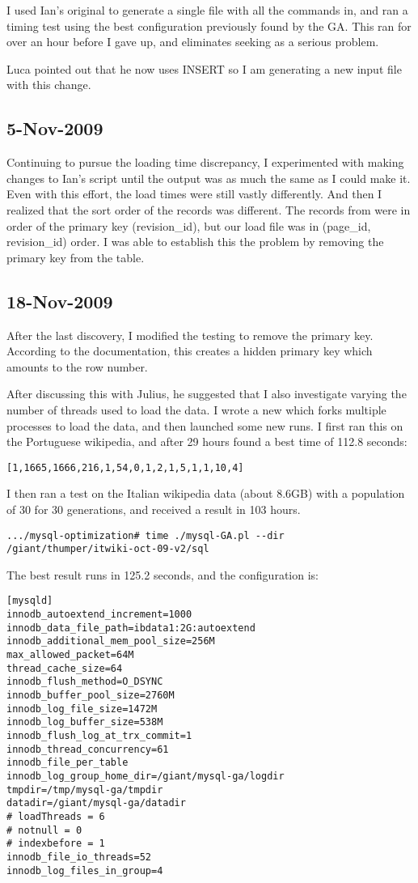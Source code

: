 I used Ian's original  to generate a single file with all the commands in,
and ran a timing test using the best configuration previously found by the GA.
This ran for over an hour before I gave up, and eliminates seeking as a serious problem.

Luca pointed out that he now uses INSERT so I am generating a new input file with this change.

\subsection{5-Nov-2009}

Continuing to pursue the loading time discrepancy, I experimented with making changes to Ian's
 script until the output was as much the same as I could make it.
Even with this effort, the load times were still vastly differently.
And then I realized that the sort order of the records was different.
The records from  were in order of the primary key (revision\_id),
but our load file was in (page\_id, revision\_id) order.
I was able to establish this the problem by removing the primary key from the table.

\subsection{18-Nov-2009}

After the last discovery, I modified the testing to remove the primary key.
According to the \mysql documentation, this creates a hidden primary key which
amounts to the row number.

After discussing this with Julius, he suggested that I also investigate varying
the number of threads used to load the data.
I wrote a new  which forks multiple \mysql processes to
load the data, and then launched some new runs.
I first ran this on the Portuguese wikipedia, and after 29 hours found a best time of
112.8 seconds:
\begin{verbatim}
[1,1665,1666,216,1,54,0,1,2,1,5,1,1,10,4]
\end{verbatim}

I then ran a test on the Italian wikipedia data (about 8.6GB) with a population of 30 for 30 generations,
and received a result in 103 hours.
\begin{verbatim}
.../mysql-optimization# time ./mysql-GA.pl --dir /giant/thumper/itwiki-oct-09-v2/sql
\end{verbatim}
The best result runs in 125.2 seconds, and the configuration is:
\begin{verbatim}
[mysqld]
innodb_autoextend_increment=1000
innodb_data_file_path=ibdata1:2G:autoextend
innodb_additional_mem_pool_size=256M
max_allowed_packet=64M
thread_cache_size=64
innodb_flush_method=O_DSYNC
innodb_buffer_pool_size=2760M
innodb_log_file_size=1472M
innodb_log_buffer_size=538M
innodb_flush_log_at_trx_commit=1
innodb_thread_concurrency=61
innodb_file_per_table
innodb_log_group_home_dir=/giant/mysql-ga/logdir
tmpdir=/tmp/mysql-ga/tmpdir
datadir=/giant/mysql-ga/datadir
# loadThreads = 6
# notnull = 0
# indexbefore = 1
innodb_file_io_threads=52
innodb_log_files_in_group=4
\end{verbatim}

